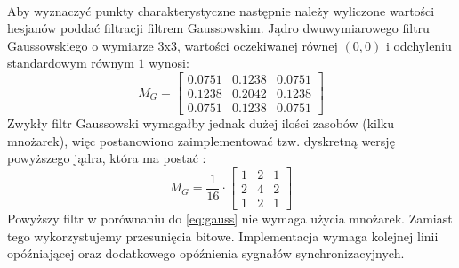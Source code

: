 \paragraph*{}
Aby wyznaczyć punkty charakterystyczne następnie należy wyliczone wartości hesjanów poddać filtracji filtrem Gaussowskim. Jądro dwuwymiarowego filtru Gaussowskiego o wymiarze \(3\)x\(3\), wartości oczekiwanej równej \((0,0)\) i odchyleniu standardowym równym \(1\) wynosi:
\begin{equation}
\label{eq:gauss}
M_G=
	\begin{bmatrix}
	0.0751 & 0.1238 & 0.0751\\
	0.1238 & 0.2042 & 0.1238\\
	0.0751 & 0.1238 & 0.0751
	\end{bmatrix}
\end{equation}
Zwykły filtr Gaussowski wymagałby jednak dużej ilości zasobów (kilku mnożarek), więc postanowiono zaimplementować tzw. dyskretną wersję powyższego jądra, która ma postać \cite{Benda}:
\begin{equation}
M_G=\frac{1}{16} \cdot
	\begin{bmatrix}
	1 & 2 & 1\\
	2 & 4 & 2\\
	1 & 2 & 1
	\end{bmatrix}
\end{equation}
Powyższy filtr w porównaniu do \ref{eq:gauss} nie wymaga użycia mnożarek. Zamiast tego wykorzystujemy przesunięcia bitowe. Implementacja wymaga kolejnej linii opóźniającej oraz dodatkowego opóźnienia sygnałów synchronizacyjnych.

